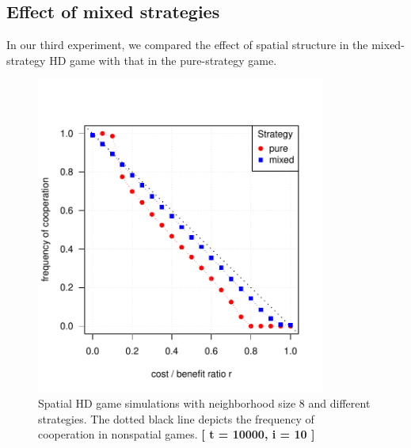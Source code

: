 \subsection{Effect of mixed strategies}

In our third experiment, we compared the effect of spatial structure in the mixed-strategy HD game with that in the pure-strategy game.


\begin{figure}[H]
	\centering 
	\includegraphics[width=9.5cm]{task3_multiplot}
	\caption{Spatial HD game simulations with neighborhood size 8 and different strategies. The dotted black line depicts the frequency of cooperation in nonspatial games.  \textbf{[ t = 10000, i = 10 ]} }\label{fig: task3_multiplot}
\end{figure}





